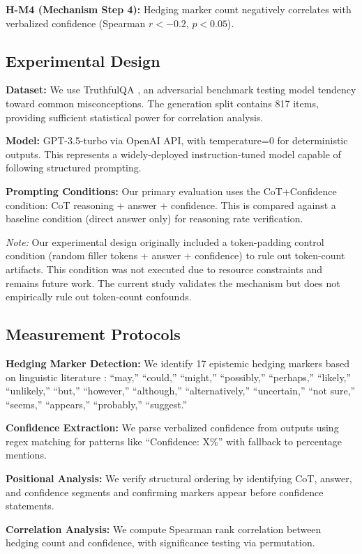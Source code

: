 \textbf{H-M4 (Mechanism Step 4):} Hedging marker count negatively correlates with verbalized confidence (Spearman $r < -0.2$, $p < 0.05$).

\subsection{Experimental Design}

\textbf{Dataset:} We use TruthfulQA \citep{lin2022truthfulqa}, an adversarial benchmark testing model tendency toward common misconceptions. The generation split contains 817 items, providing sufficient statistical power for correlation analysis.

\textbf{Model:} GPT-3.5-turbo via OpenAI API, with temperature=0 for deterministic outputs. This represents a widely-deployed instruction-tuned model capable of following structured prompting.

\textbf{Prompting Conditions:} Our primary evaluation uses the CoT+Confidence condition: CoT reasoning + answer + confidence. This is compared against a baseline condition (direct answer only) for reasoning rate verification.

\textit{Note:} Our experimental design originally included a token-padding control condition (random filler tokens + answer + confidence) to rule out token-count artifacts. This condition was not executed due to resource constraints and remains future work. The current study validates the mechanism but does not empirically rule out token-count confounds.

\subsection{Measurement Protocols}

\textbf{Hedging Marker Detection:} We identify 17 epistemic hedging markers based on linguistic literature \citep{hyland1998hedging}: ``may,'' ``could,'' ``might,'' ``possibly,'' ``perhaps,'' ``likely,'' ``unlikely,'' ``but,'' ``however,'' ``although,'' ``alternatively,'' ``uncertain,'' ``not sure,'' ``seems,'' ``appears,'' ``probably,'' ``suggest.''

\textbf{Confidence Extraction:} We parse verbalized confidence from outputs using regex matching for patterns like ``Confidence: X\%'' with fallback to percentage mentions.

\textbf{Positional Analysis:} We verify structural ordering by identifying CoT, answer, and confidence segments and confirming markers appear before confidence statements.

\textbf{Correlation Analysis:} We compute Spearman rank correlation between hedging count and confidence, with significance testing via permutation.
